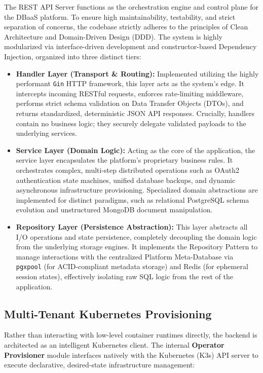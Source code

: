 The REST API Server functions as the orchestration engine and control plane for the DBaaS platform. To ensure high maintainability, testability, and strict separation of concerns, the codebase strictly adheres to the principles of Clean Architecture and Domain-Driven Design (DDD). The system is highly modularized via interface-driven development and constructor-based Dependency Injection, organized into three distinct tiers:

\begin{itemize}
    \item \textbf{Handler Layer (Transport \& Routing):} Implemented utilizing the highly performant \texttt{Gin} HTTP framework, this layer acts as the system's edge. It intercepts incoming RESTful requests, enforces rate-limiting middleware, performs strict schema validation on Data Transfer Objects (DTOs), and returns standardized, deterministic JSON API responses. Crucially, handlers contain no business logic; they securely delegate validated payloads to the underlying services.
    \item \textbf{Service Layer (Domain Logic):} Acting as the core of the application, the service layer encapsulates the platform's proprietary business rules. It orchestrates complex, multi-step distributed operations such as OAuth2 authentication state machines, unified database backups, and dynamic asynchronous infrastructure provisioning. Specialized domain abstractions are implemented for distinct paradigms, such as relational PostgreSQL schema evolution and unstructured MongoDB document manipulation.
    \item \textbf{Repository Layer (Persistence Abstraction):} This layer abstracts all I/O operations and state persistence, completely decoupling the domain logic from the underlying storage engines. It implements the Repository Pattern to manage interactions with the centralized Platform Meta-Database via \texttt{pgxpool} (for ACID-compliant metadata storage) and Redis (for ephemeral session states), effectively isolating raw SQL logic from the rest of the application.
\end{itemize}

\subsection{Multi-Tenant Kubernetes Provisioning}

Rather than interacting with low-level container runtimes directly, the backend is architected as an intelligent Kubernetes client. The internal \textbf{Operator Provisioner} module interfaces natively with the Kubernetes (K3s) API server to execute declarative, desired-state infrastructure management:

